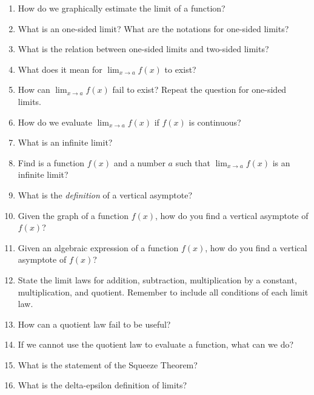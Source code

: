 \documentclass[../main.tex]{subfiles}
\begin{document}
\begin{enumerate}[label={\thesection.\arabic*.}, align=left]
  \item How do we graphically estimate the limit of a function?

  \item What is an one-sided limit? What are the notations for one-sided limits?

  \item What is the relation between one-sided limits and two-sided limits?

  \item What does it mean for \(\lim_{x \to a} f(x)\) to exist?

  \item How can \(\lim_{x \to a} f(x)\) fail to exist? Repeat the question for one-sided limits.

  \item How do we evaluate \(\lim_{x \to a} f(x)\) if \(f(x)\) is continuous?

  \item What is an infinite limit? 

  \item Find is a function \(f(x)\) and a number \(a\) such that \(\lim_{x \to a} f(x)\) is an infinite limit?

  \item What is the \emph{definition} of a vertical asymptote? 

  \item Given the graph of a function \(f(x)\), how do you find a vertical asymptote of \(f(x)\)?

  \item Given an algebraic expression of a function \(f(x)\), how do you find a vertical asymptote of \(f(x)\)?

  \item State the limit laws for addition, subtraction, multiplication by a constant, multiplication, and quotient. Remember to include all conditions of each limit law. 

  \item How can a quotient law fail to be useful?

  \item If we cannot use the quotient law to evaluate a function, what can we do? 

  \item What is the statement of the Squeeze Theorem?

  \item What is the delta-epsilon definition of limits? 


\end{enumerate}
\end{document}
